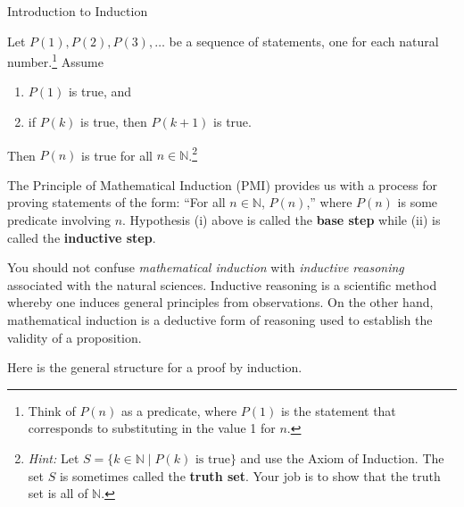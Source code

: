 \begin{section}{Introduction to Induction}
\begin{theorem}\label{thm:PMI}
Let $P(1), P(2), P(3), \ldots$ be a sequence of statements, one for each natural number.\footnote{Think of $P(n)$ as a predicate, where $P(1)$ is the statement that corresponds to substituting in the value 1 for $n$.} Assume
\begin{enumerate}[label=\textrm{(\roman*)}]
\item $P(1)$ is true, and
\item if $P(k)$ is true, then $P(k+1)$ is true.
\end{enumerate}
Then $P(n)$ is true for all $n\in\mathbb{N}$.\footnote{\emph{Hint:} Let $S=\{k\in \mathbb{N}\mid P(k) \text{ is true}\}$ and use the Axiom of Induction.  The set $S$ is sometimes called the \textbf{truth set}.  Your job is to show that the truth set is all of $\mathbb{N}$.}
\end{theorem}

The Principle of Mathematical Induction (PMI) provides us with a process for proving statements of the form: ``For all $n\in\mathbb{N}$, $P(n)$,'' where $P(n)$ is some predicate involving $n$.  Hypothesis (i) above is called the \textbf{base step} while (ii) is called the \textbf{inductive step}.

You should not confuse \emph{mathematical induction} with \emph{inductive reasoning} associated with the natural sciences. Inductive reasoning is a scientific method whereby one induces general principles from observations. On the other hand, mathematical induction is a deductive form of reasoning used to establish the validity of a proposition.

\begin{skeleton}
Here is the general structure for a proof by induction.

\begin{center}
\end{center}
\end{skeleton}


\end{section}

